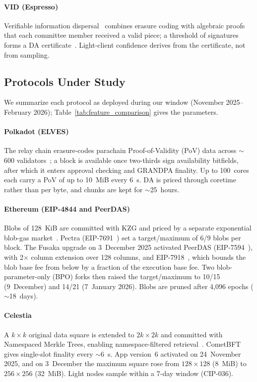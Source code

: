 \paragraph{VID (Espresso)}
Verifiable information dispersal~\cite{Cachin2005AVID} combines erasure coding with algebraic proofs that each committee member received a valid piece; a threshold of signatures forms a DA certificate~\cite{Espresso:Hotshot_and_Triamisu}.
Light-client confidence derives from the certificate, not from sampling.

\subsection{Protocols Under Study}
\label{subsec:protocol-descriptions}

We summarize each protocol as deployed during our window (November 2025--February 2026); Table~\ref{tab:feature_comparison} gives the parameters.

\paragraph{Polkadot (ELVES)}
The relay chain erasure-codes parachain Proof-of-Validity (PoV) data across $\sim$600 validators~\cite{Jeff_Burdges_ELVES, Overview_of_polkadot}; a block is available once two-thirds sign availability bitfields, after which it enters approval checking and GRANDPA finality.
Up to 100~cores each carry a PoV of up to 10~MiB every 6~s. DA is priced through coretime rather than per byte, and chunks are kept for $\sim$25~hours.

\paragraph{Ethereum (EIP-4844 and PeerDAS)}
Blobs of 128~KiB are committed with KZG and priced by a separate exponential blob-gas market~\cite{EIP-4844}.
Pectra (EIP-7691~\cite{EIP-7691}) set a target/maximum of 6/9 blobs per block.
The Fusaka upgrade on 3~December 2025 activated PeerDAS (EIP-7594~\cite{EIP-7594}), with 2$\times$ column extension over 128 columns, and EIP-7918~\cite{EIP-7918}, which bounds the blob base fee from below by a fraction of the execution base fee.
Two blob-parameter-only (BPO) forks then raised the target/maximum to 10/15 (9~December) and 14/21 (7~January 2026).
Blobs are pruned after 4{,}096 epochs ($\sim$18~days).

\paragraph{Celestia}
A $k \times k$ original data square is extended to $2k \times 2k$ and committed with Namespaced Merkle Trees, enabling namespace-filtered retrieval~\cite{AlBassam_LazyLedger}.
CometBFT gives single-slot finality every $\sim$6~s. App version~6 activated on 24~November 2025, and on 3~December the maximum square rose from $128 \times 128$ (8~MiB) to $256 \times 256$ (32~MiB). Light nodes sample within a 7-day window (CIP-036).

